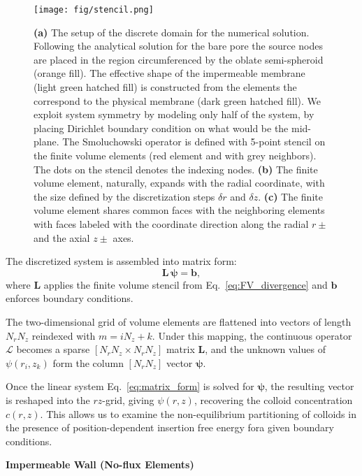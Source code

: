 \documentclass[10pt, a4paper, twocolumn]{article}
\begin{document}
\begin{figure}[]
  \texttt{[image: fig/stencil.png]}
  \caption{\textbf{(a)} The setup of the discrete domain for the numerical solution.
  Following the analytical solution for the bare pore the source nodes are placed in the region circumferenced by the oblate semi-spheroid (orange fill).
  The effective shape of the impermeable membrane (light green hatched fill) is constructed from the elements the correspond to the physical membrane (dark green hatched fill).
  We exploit system symmetry by modeling only half of the system, by placing Dirichlet boundary condition on what would be the mid-plane.
  The Smoluchowski operator is defined with 5-point stencil on the finite volume elements (red element and with grey neighbors).
  The dots on the stencil denotes the indexing nodes.
  \textbf{(b)} The finite volume element, naturally, expands with the radial coordinate, with the size defined by the discretization steps $\delta r$ and $\delta z$.
  \textbf{(c)} The finite volume element shares common faces with the neighboring elements with faces labeled with the coordinate direction along the radial $r \pm$ and the axial $z\pm$ axes.
  }
  \label{fig:stencil}
\end{figure}




The discretized system is assembled into matrix form:
\begin{equation}
  \mathbf L\, \bm{\psi}=\bm b,
  \label{eq:matrix_form}
\end{equation}
where $\mathbf{L}$ applies the finite volume stencil from Eq.~\ref{eq:FV_divergence} and $\bm b$ enforces boundary conditions.

The two-dimensional grid of volume elements are flattened into vectors of length $N_rN_z$ reindexed with $m=iN_z+k$.
Under this mapping, the continuous operator $\mathcal L$ becomes a sparse $[N_rN_z\times N_rN_z]$ matrix $\mathbf L$, and the unknown values of $\psi(r_i, z_k)$ form the column $[N_rN_z]$ vector $\bm{\psi}$.

Once the linear system Eq.~\ref{eq:matrix_form} is solved for $\bm{\psi}$, the resulting vector is reshaped into the $rz$-grid, giving $\psi(r,z)$, recovering the colloid concentration $c(r,z)$.
This allows us to examine the non-equilibrium partitioning of colloids in the presence of position-dependent insertion free energy fora given boundary conditions.

\textbf{Impermeable Wall (No-flux Elements)}
\end{document}
